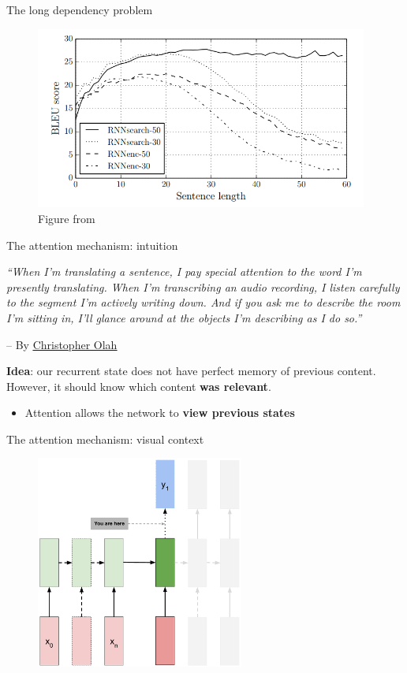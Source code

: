 \documentclass[12pt,aspectratio=169,handout]{beamer}
\begin{document}
\begin{frame}{The long dependency problem}
	\begin{figure}[h]
		\includegraphics[height=6cm]{sequence_length}
		\caption*{Figure from \cite{bahdanau2014neural}}
	\end{figure}	
\end{frame}
	

\begin{frame}{The attention mechanism: intuition}

\hspace*{\parindent}	\emph{``When I’m translating a sentence, I pay special attention to the word I’m presently translating.
	When I’m transcribing an audio recording, I listen carefully to the segment I’m actively writing down. 
	And if you ask me to describe the room I’m sitting in, I’ll glance around at the objects I’m describing as I do so.''}

-- By \href{https://distill.pub/2016/augmented-rnns/}{\underline{Christopher Olah}}

\pause
\vspace{1em}
\textbf{Idea}: our recurrent state does not have perfect memory of previous content.
However, it should know which content \textbf{was relevant}.
\begin{itemize}
	\item Attention allows the network to \textbf{view previous states}
\end{itemize} 

\end{frame}

\begin{frame}{The attention mechanism: visual context}
	\begin{figure}[h]
		\includegraphics[height=7cm]{seq2seq_attention_motivation.pdf}
	\end{figure}	
\end{frame}
\end{document}
